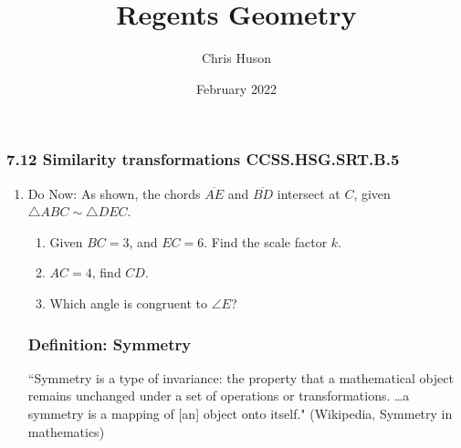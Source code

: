 \documentclass[12pt, twoside]{article}
\title{Regents Geometry}
\author{Chris Huson}
\date{February 2022}
\begin{document}
\subsubsection*{7.12 Similarity transformations \hfill CCSS.HSG.SRT.B.5}
\begin{enumerate}
\item Do Now: As shown, the chords $\overline{AE}$ and $\overline{BD}$ intersect at $C$, given $\triangle ABC \sim \triangle DEC$.
\begin{multicols}{2}
  \begin{enumerate}
    \item Given $BC=3$, and $EC=6$. Find the scale factor $k$.
    \item $AC=4$, find $CD$.
    \item Which angle is congruent to $\angle E$? \vspace{1cm}
  \end{enumerate}
  \begin{flushright}
  \end{flushright}
\end{multicols}

\subsubsection*{Definition: Symmetry}
``Symmetry is a type of invariance: the property that a mathematical object remains unchanged under a set of operations or transformations.
\dots a symmetry is a mapping of [an] object onto itself." (Wikipedia, Symmetry in mathematics) \vspace{0.5cm}



\end{enumerate}
\end{document}
